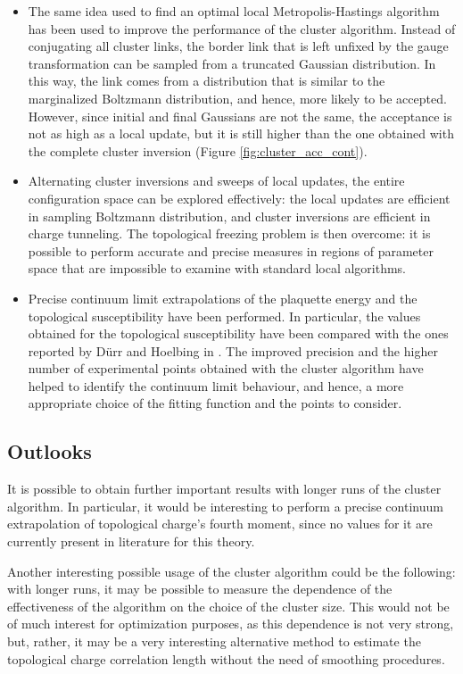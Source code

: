 \begin{itemize}
    \item
        The same idea used to find an optimal local Metropolis-Hastings algorithm has been used to improve the performance of the cluster algorithm.
        Instead of conjugating all cluster links, the border link that is left unfixed by the gauge transformation can be sampled from a truncated Gaussian distribution.
        In this way, the link comes from a distribution that is similar to the marginalized Boltzmann distribution, and hence, more likely to be accepted.
        However, since initial and final Gaussians are not the same, the acceptance is not as high as a local update,
        but it is still higher than the one obtained with the complete cluster inversion (Figure \ref{fig:cluster_acc_cont}).
    \item
        Alternating cluster inversions and sweeps of local updates, the entire configuration space can be explored effectively:
        the local updates are efficient in sampling Boltzmann distribution, and cluster inversions are efficient in charge tunneling.
        The topological freezing problem is then overcome:
        it is possible to perform accurate and precise measures in regions of parameter space that are impossible to examine with standard local algorithms.
    \item
        Precise continuum limit extrapolations of the plaquette energy and the topological susceptibility have been performed.
        In particular, the values obtained for the topological susceptibility have been compared with the ones reported by
        D\"urr and Hoelbing in \cite{durr-hoelbling:2005}.
        The improved precision and the higher number of experimental points obtained with the cluster algorithm have helped to identify the continuum limit behaviour,
        and hence, a more appropriate choice of the fitting function and the points to consider.
\end{itemize}

\subsection*{Outlooks}
It is possible to obtain further important results with longer runs of the cluster algorithm.
In particular, it would be interesting to perform a precise continuum extrapolation of topological charge's fourth moment,
since no values for it are currently present in literature for this theory.

Another interesting possible usage of the cluster algorithm could be the following:
with longer runs, it may be possible to measure the dependence of the effectiveness of the algorithm on the choice of the cluster size.
This would not be of much interest for optimization purposes, as this dependence is not very strong,
but, rather, it may be a very interesting alternative method to estimate the topological charge correlation length without the need of smoothing procedures.

